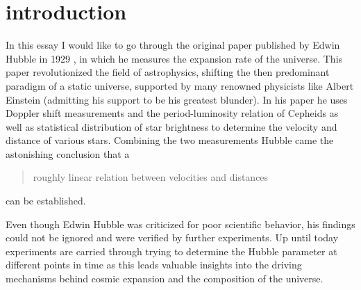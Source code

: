 \section{introduction}
In this essay I would like to go through the original paper published by Edwin Hubble in 1929 \autocite{Hubble1929}, in which he measures the expansion rate of the universe. This paper revolutionized the field of astrophysics, shifting the then predominant paradigm of a static universe, supported by many renowned physicists like Albert Einstein (admitting his support to be his greatest blunder). In his paper he uses Doppler shift measurements and the period-luminosity relation of Cepheids as well as statistical distribution of star brightness to determine the velocity and distance of various stars. Combining the two measurements Hubble came the astonishing conclusion that a \blockcquote{Hubble1929}{roughly linear relation between velocities and distances} can be established. 

Even though Edwin Hubble was criticized for poor scientific behavior, his findings could not be ignored and were verified by further experiments. Up until today experiments are carried through trying to determine the Hubble parameter at different points in time as this leads valuable insights into the driving mechanisms behind cosmic expansion and the composition of the universe. 
